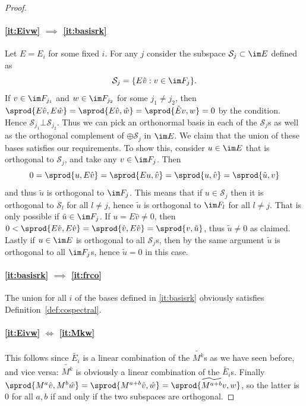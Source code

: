 \begin{proof}
\paragraph{\ref{it:Eivw} $\implies$ \ref{it:basisrk}} Let $E = E_i$ for some fixed $i$. For any $j$ consider the subspace $\mathcal{S}_j \subset \im E$ defined as
\[ \mathcal{S}_j = \{ E \hat{v} : v \in \im F_j \}. \]
If $v \in \im F_{j_1}$ and $w \in \im F_{j_2}$ for some $j_1 \neq j_2$, then $\sprod{E \hat{v}, E\hat{w}} = \sprod{E \hat{v}, \hat{w}} = \sprod{\tilde{E} v, w} = 0$ by the condition. Hence $\mathcal{S}_{j_1} \bot \mathcal{S}_{j_2}$. Thus we can pick an orthonormal basis in each of the $\mathcal{S}_j$s as well as the orthogonal complement of $\oplus \mathcal{S}_j$ in $\im E$. We claim that the union of these bases satisfies our requirements. To show this, consider $u \in \im E$ that is orthogonal to $\mathcal{S}_j$, and take any $v \in \im F_j$. Then
\[ 0 = \sprod{u, E \hat{v}} = \sprod{E u, \hat{v}} = \sprod{u, \hat{v}} = \sprod{\tilde{u},v}\] and thus $\tilde{u}$ is orthogonal to $\im F_j$. This means that if $u \in \mathcal{S}_j$ then it is orthogonal to $\mathcal{S}_{l}$ for all $l \neq j$, hence $\tilde{u}$ is orthogonal to $\im F_l$ for all $l \neq j$. That is only possible if $\tilde{u} \in \im F_j$. If $u = E\hat{v} \neq 0$, then $0 < \sprod{E \hat{v}, E \hat{v}} = \sprod{\hat{v},E\hat{v}} = \sprod{v, \tilde{u}}$, thus $\tilde{u} \neq 0$ as claimed. Lastly if $u \in \im E$ is orthogonal to all $\mathcal{S}_j$s, then by the same argument $\tilde{u}$ is orthogonal to all $\im F_j$s, hence $\tilde{u} = 0$ in this case.

\paragraph{\ref{it:basisrk} $\implies$ \ref{it:frco}} The union for all $i$ of the bases defined in \ref{it:basisrk} obviously satisfies Definition~\ref{def:cospectral}.

\paragraph{\ref{it:Eivw} $\Longleftrightarrow$ \ref{it:Mkw}} This follows since $\tilde{E_i}$ is a linear combination of the $\widetilde{M^k}$s as we have seen before, and vice versa: $\widetilde{M^k}$ is obviously a linear combination of the $\tilde{E_i}$s. Finally $\sprod{M^a \hat{v}, M^b \hat{w}} = \sprod{M^{a+b} \hat{v}, \hat{w}} = \sprod{\widetilde{M^{a+b}}v, w}$, so the latter is 0 for all $a,b$ if and only if the two subspaces are orthogonal. 
\end{proof}

